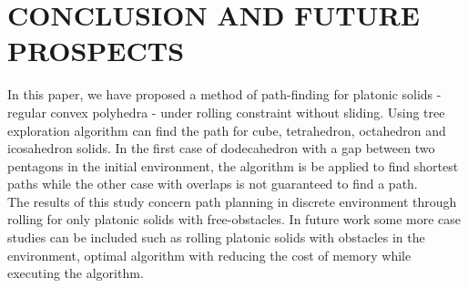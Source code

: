 
\section{CONCLUSION AND FUTURE PROSPECTS}
In this paper, we have proposed a method of path-finding for platonic solids - regular convex polyhedra - under rolling constraint without sliding. Using tree exploration algorithm can find the path for cube, tetrahedron, octahedron and icosahedron solids. In the first case of dodecahedron with a gap between two pentagons in the initial environment, the algorithm is be applied to find shortest paths while the other case with overlaps is not guaranteed to find a path.\\


\noindent The results of this study concern path planning in discrete environment through rolling for only platonic solids with free-obstacles.
In future work some more case studies can be included such as rolling platonic solids with obstacles in the environment, optimal algorithm with reducing the cost of memory while executing the algorithm.\\

%
%
%
